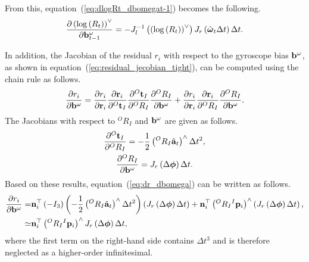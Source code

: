 From this, equation~(\ref{eq:dlogRt_dbomegat-1}) becomes the following.
%
\begin{align}
  \frac{ \partial \left( \log \left( R_{t} \right) \right)^{\vee} }{ \partial {\bf b}_{t-1}^{\omega} }
  =
  - J_{l}^{-1} \left( \left( \log \left( R_{t} \right) \right)^{\vee} \right)
  J_{r} \left( \hat{ \boldsymbol \omega }_{t} \Delta t \right) \Delta t.
\end{align}

In addition, the Jacobian of the residual $r_{i}$ with respect to the gyroscope bias ${\bf b}^{\omega}$, as shown in equation~(\ref{eq:residual_jecobian_tight}), can be computed using the chain rule as follows.
%
\begin{align}
  \frac{ \partial r_{i} }{ \partial {\bf b}^{\omega} }
  =
  \frac{ \partial r_{i} }{ \partial {\bf r}_{i} }
  \frac{ \partial {\bf r}_{i} }{ \partial {}^{O}{\bf t}_{I} }
  \frac{ \partial {}^{O}{\bf t}_{I} }{ \partial {}^{O}R_{I} }
  \frac{ \partial {}^{O}R_{I} }{ \partial {\bf b}^{\omega} }
  +
  \frac{ \partial r_{i} }{ \partial {\bf r}_{i} }
  \frac{ \partial {\bf r}_{i} }{ \partial {}^{O}R_{I} }
  \frac{ \partial {}^{O}R_{I} }{ \partial {\bf b}^{\omega} }.
  \label{eq:dr_dbomega}
\end{align}
%
The Jacobians with respect to ${}^{O}R_{I}$ and ${\bf b}^{\omega}$ are given as follows.
%
\begin{align}
  \begin{gathered}
    \frac{ \partial {}^{O}{\bf t}_{I} }{ \partial {}^{O}R_{I} }
    =
    -\frac{1}{2} \left( {}^{O}R_{I} \hat{ {\bf a} }_{t} \right)^{\wedge} \Delta t^{2}, \\
%
    \frac{ \partial {}^{O}R_{I} }{ \partial {\bf b}^{\omega} }
    =
    J_{r} \left( \Delta \boldsymbol \phi \right) \Delta t.
  \end{gathered}
\end{align}
%
Based on these results, equation~(\ref{eq:dr_dbomega}) can be written as follows.
%
\begin{align}
  \begin{split}
    \frac{ \partial r_{i} }{ \partial {\bf b}^{\omega} }
    = &
    {\bf n}_{i}^{\top}
    \left( -I_{3} \right)
    \left( -\frac{1}{2} \left( {}^{O}R_{I} \hat{ {\bf a} }_{t} \right)^{\wedge} \Delta t^{2} \right)
    \left( J_{r} \left( \Delta \boldsymbol \phi \right) \Delta t \right)
    +
    {\bf n}_{i}^{\top}
    \left( {}^{O}R_{I} {}^{I}{\bf p}_{i} \right)^{\wedge}
    \left( J_{r} \left( \Delta \boldsymbol \phi \right) \Delta t \right), \\
    \simeq &
    {\bf n}_{i}^{\top}
    \left( {}^{O}R_{I} {}^{I}{\bf p}_{i} \right)^{\wedge}
    J_{r} \left( \Delta \boldsymbol \phi \right) \Delta t,
  \end{split}
\end{align}
%
where the first term on the right-hand side contains $\Delta t^{3}$ and is therefore neglected as a higher-order infinitesimal.















